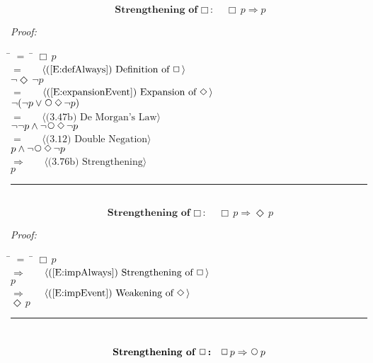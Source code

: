 \documentclass[fleqn, leqno]{article}
\newcommand{\lgap}{2pt} %
\newcommand{\mymathindent}{24pt} %
\newcommand{\Next}{\;\,\text{\raisebox{3.5pt}{\circle{6}}}}
\newcommand{\Event}{\Diamond\,}
\newcommand{\Always}{\Box\,}
\newcommand{\myqed}{\hfill\rule[-.23ex]{1.2ex}{2.0ex}}
\newcommand{\Gll} {\langle} %
\newcommand{\Ggg} {\rangle} %
\newcommand{\Hint}[1] {\ \ \ $\Gll \mbox{#1} \Ggg$ } %
\begin{document}
\begin{equation}\label{E:impAlways}
\textbf{Strengthening of $\Always$:}\quad \Always p \Rightarrow p
\end{equation}

\emph{Proof:}
\begin{tabbing}
\hspace{\mymathindent} \= $= \;$ \= \kill
\> \> $\Always p$\\[\lgap]
\> $=$ \> \Hint{(\ref{E:defAlways}) Definition of $\Always$}\\[\lgap]
\> \> $\lnot\Event\lnot p$\\[\lgap]
\> $=$ \> \Hint{(\ref{E:expansionEvent}) Expansion of $\Event$}\\[\lgap]
\> \> $\lnot(\lnot p \lor \Next\Event\lnot p)$\\[\lgap]
\> $=$ \> \Hint{(3.47b) De Morgan's Law}\\[\lgap]
\> \> $\lnot\lnot p \land \lnot\Next\Event\lnot p$\\[\lgap]
\> $=$ \> \Hint{(3.12) Double Negation}\\[\lgap]
\> \> $p \land \lnot\Next\Event\lnot p$\\[\lgap]
\> $\Rightarrow$ \> \Hint{(3.76b) Strengthening}\\[\lgap]
\> \> $p$\\[\lgap]
\end{tabbing}
\myqed\\[\lgap]


\begin{equation}\label{E:impAlwaysE}
\textbf{Strengthening of $\Always$:}\quad \Always p \Rightarrow \Event p
\end{equation}


\emph{Proof:}
\begin{tabbing}
\hspace{\mymathindent} \= $= \;$ \= \kill
\> \> $\Always p$\\[\lgap]
\> $\Rightarrow$ \> \Hint{(\ref{E:impAlways}) Strengthening of $\Always$}\\[\lgap]
\> \> $p$\\[\lgap]
\> $\Rightarrow$ \> \Hint{(\ref{E:impEvent}) Weakening of $\Event$}\\[\lgap]
\> \> $\Event p$\\[\lgap]
\end{tabbing}
\myqed\\[\lgap]


\begin{equation}\label{E:impAlwaysN}
\textbf{Strengthening of $\Always$:}\quad \Always p \Rightarrow \Next p
\end{equation}
\end{document}
